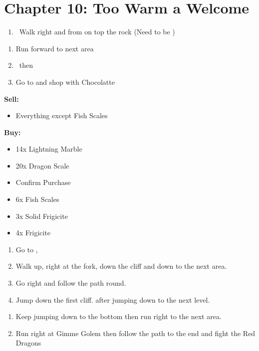 \chapter{Chapter 10: Too Warm a Welcome}
\begin{enumerate}
	\item \cs\, Walk right and  from on top the rock (Need to be \bigc)
\end{enumerate}
\begin{enumerate}[resume]
	\item Run forward to next area
	\item \cs\, then 
	\item Go to  and shop with Chocolatte
\end{enumerate}
\begin{shop}
\textbf{Sell:}
	\begin{itemize}
		\item Everything except Fish Scales
	\end{itemize}
\textbf{Buy:}
	\begin{itemize}
		\item 14x Lightning Marble
		\item 20x Dragon Scale
		\item Confirm Purchase
		\item 6x Fish Scales
		\item 3x Solid Frigicite
		\item 4x Frigicite
	\end{itemize}
\end{shop}
\begin{enumerate}[resume]
	\item Go to , 
	\item Walk up, right at the fork, down the cliff and down to the next area.
	\item Go right and follow the path round.
	\item Jump down the first cliff.  after jumping down to the next level.
\end{enumerate}
\begin{enumerate}[resume]
	\item Keep jumping down to the bottom then run right to the next area.
	\item Run right at Gimme Golem then follow the path to the end and fight the Red Dragons
\end{enumerate}
